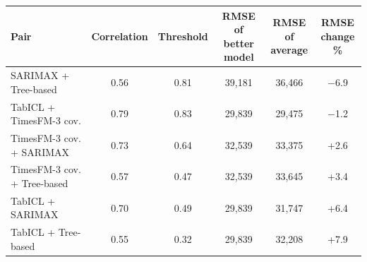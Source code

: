 \setlength{\tabcolsep}{3pt}
\begin{tabular}{lccccc}
\toprule
Pair & Correlation & Threshold & \shortstack{RMSE of\\better model} & \shortstack{RMSE of\\average} & \shortstack{RMSE\\change \%} \\
\midrule
SARIMAX + Tree-based & 0.56 & 0.81 & 39,181 & 36,466 & $-$6.9 \\
TabICL + TimesFM-3 cov. & 0.79 & 0.83 & 29,839 & 29,475 & $-$1.2 \\
TimesFM-3 cov. + SARIMAX & 0.73 & 0.64 & 32,539 & 33,375 & +2.6 \\
TimesFM-3 cov. + Tree-based & 0.57 & 0.47 & 32,539 & 33,645 & +3.4 \\
TabICL + SARIMAX & 0.70 & 0.49 & 29,839 & 31,747 & +6.4 \\
TabICL + Tree-based & 0.55 & 0.32 & 29,839 & 32,208 & +7.9 \\
\bottomrule
\end{tabular}
